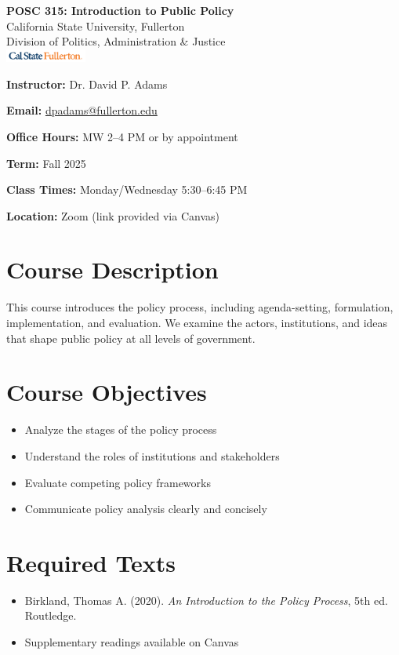 \documentclass[11pt]{article}
\newcommand{\syllabusField}[2]{\textbf{#1:} #2\par\medskip}
\begin{document}
\begin{center}
  {\LARGE\textbf{POSC 315: Introduction to Public Policy}}\\[0.5em]
  {\large California State University, Fullerton}\\
  {\large Division of Politics, Administration \& Justice}\\[1em]
  \includegraphics[width=0.2\textwidth, alt={CSUF logo}]{csuf_logo.png}
\end{center}
\vspace{1em}

\syllabusField{Instructor}{Dr. David P. Adams}
\syllabusField{Email}{\href{mailto:dpadams@fullerton.edu}{dpadams@fullerton.edu}}
\syllabusField{Office Hours}{MW 2–4 PM or by appointment}
\syllabusField{Term}{Fall 2025}
\syllabusField{Class Times}{Monday/Wednesday 5:30–6:45 PM}
\syllabusField{Location}{Zoom (link provided via Canvas)}

\section*{Course Description}
This course introduces the policy process, including agenda-setting, formulation, implementation, and evaluation. We examine the actors, institutions, and ideas that shape public policy at all levels of government.

\section*{Course Objectives}
\begin{itemize}[leftmargin=1.5em]
  \item Analyze the stages of the policy process
  \item Understand the roles of institutions and stakeholders
  \item Evaluate competing policy frameworks
  \item Communicate policy analysis clearly and concisely
\end{itemize}

\section*{Required Texts}
\begin{itemize}[leftmargin=1.5em]
  \item Birkland, Thomas A. (2020). \textit{An Introduction to the Policy Process}, 5th ed. Routledge.
  \item Supplementary readings available on Canvas
\end{itemize}
\end{document}
